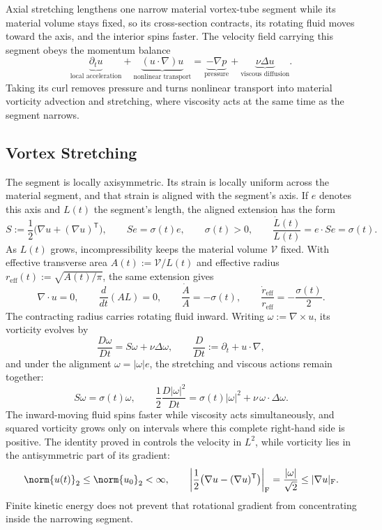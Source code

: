 
Axial stretching lengthens one narrow material vortex-tube segment while its material volume stays fixed, so its cross-section contracts, its rotating fluid moves toward the axis, and the interior spins faster.
The velocity field carrying this segment obeys the momentum balance
\[
  \underbrace{\partial_t u}_{\text{local acceleration}}
  +
  \underbrace{(u\cdot\nabla)u}_{\text{nonlinear transport}}
  =
  \underbrace{-\nabla p}_{\text{pressure}}
  +
  \underbrace{\nu\Delta u}_{\text{viscous diffusion}}.
\]
Taking its curl removes pressure and turns nonlinear transport into material vorticity advection and stretching, where viscosity acts at the same time as the segment narrows.

\subsection{Vortex Stretching}\label{sub:ThePerfectlyStretchingVortex}

The segment is locally axisymmetric.
Its strain is locally uniform across the material segment, and that strain is aligned with the segment's axis.
If \(e\) denotes this axis and \(L(t)\) the segment's length, the aligned extension has the form
\[
  S:=\frac12\bigl(\nabla u+(\nabla u)^{\mathsf T}\bigr),
  \qquad
  Se=\sigma(t)e,
  \qquad
  \sigma(t)>0,
  \qquad
  \frac{\dot L(t)}{L(t)}
  =
  e\cdot Se
  =
  \sigma(t).
\]
As \(L(t)\) grows, incompressibility keeps the material volume \(\mathcal V\) fixed.
With effective transverse area \(A(t):=\mathcal V/L(t)\) and effective radius \(r_{\mathrm{eff}}(t):=\sqrt{A(t)/\pi}\), the same extension gives
\[
  \nabla\cdot u=0,
  \qquad
  \frac{d}{dt}(A L)=0,
  \qquad
  \frac{\dot A}{A}=-\sigma(t),
  \qquad
  \frac{\dot r_{\mathrm{eff}}}{r_{\mathrm{eff}}}
  =
  -\frac{\sigma(t)}{2}.
\]
The contracting radius carries rotating fluid inward.
Writing \(\omega:=\nabla\times u\), its vorticity evolves by
\[
  \frac{D\omega}{Dt}
  =
  S\omega+\nu\Delta\omega,
  \qquad
  \frac{D}{Dt}
  :=
  \partial_t+u\cdot\nabla,
\]
and under the alignment \(\omega=|\omega|e\), the stretching and viscous actions remain together:
\[
  S\omega
  =
  \sigma(t)\omega,
  \qquad
  \frac12\frac{D|\omega|^2}{Dt}
  =
  \sigma(t)|\omega|^2
  +
  \nu\,\omega\cdot\Delta\omega.
\]
The inward-moving fluid spins faster while viscosity acts simultaneously, and squared vorticity grows only on intervals where this complete right-hand side is positive.
The identity proved in  controls the velocity in \(L^2\), while vorticity lies in the antisymmetric part of its gradient:
\[
  \norm{u(t)}_2
  \leq
  \norm{u_0}_2
  <\infty,
  \qquad
  \left|\frac12\bigl(\nabla u-(\nabla u)^{\mathsf T}\bigr)\right|_{\mathrm F}
  =
  \frac{|\omega|}{\sqrt2}
  \leq
  |\nabla u|_{\mathrm F}.
\]
Finite kinetic energy does not prevent that rotational gradient from concentrating inside the narrowing segment.

